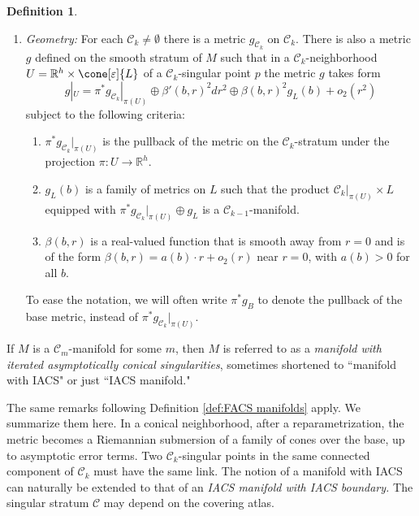 \documentclass[12pt, reqno]{amsart}
\theoremstyle{plain} %
\theoremstyle{definition}
\newtheorem{definition}[theorem]{Definition}
\theoremstyle{remark}
\numberwithin{equation}{section}
\newcommand{\cat}[1]{\mathcal{#1}}
\newcommand{\field}[1]{\mathbb{#1}}
\newcommand{\R}{\field{R}}
\newcommand{\hdim}{h} %
\begin{document}
\begin{definition}
\begin{enumerate}[label=(\alph*)]
        The \textit{\(\cat{C}_k\)-stratum} is the set of \(\cat{C}_k\)-singular points of \(M\).
        This set is denoted by \(\cat{C}_k\).
        The singular stratum is denoted by \(\cat{C}\) and is defined to be \(\cat{C} \coloneqq \cup_{k=1}^m \cat{C}_k\).
        The smooth stratum, or \(\cat{C}_0\)-stratum, is the complement \(M \setminus \cat{C}\) and is denoted by \(\cat{C}_0\).
        \item \emph{Geometry:} For each \(\cat{C}_k \neq \emptyset\) there is a metric \(g_{\cat{C}_k}\) on \(\cat{C}_k\).
        There is also a metric \(g\) defined on the smooth stratum of \(M\) such that in a \(\cat{C}_k\)-neighborhood \(U = \R^\hdim \times \cone[\varepsilon]{L}\) of a \(\cat{C}_k\)-singular point \(p\) the metric \(g\) takes form
        \begin{equation*}
            g|_U = \pi^*g_{\cat{C}_k}|_{\pi(U)} \oplus \beta'(b,r)^2 dr^2 \oplus \beta(b,r)^2 g_L(b) + o_2(r^2)
        \end{equation*}
        subject to the following criteria:
        \begin{enumerate}
            \item \(\pi^*g_{\cat{C}_k}|_{\pi(U)}\) is the pullback of the metric on the \(\cat{C}_k\)-stratum under the projection \(\pi \colon U \to \R^\hdim\).
            \item \(g_L(b)\) is a family of metrics on \(L\) such that the product \(\cat{C}_k|_{\pi(U)} \times L\) equipped with \(\pi^*g_{\cat{C}_k}|_{\pi(U)} \oplus g_L\) is a \(\cat{C}_{k-1}\)-manifold.
            \item \(\beta(b,r)\) is a real-valued function that is smooth away from \(r=0\) and is of the form \(\beta(b,r) = a(b) \cdot r + o_2(r)\) near \(r=0\), with \(a(b) > 0\) for all \(b\).
        \end{enumerate}
        To ease the notation, we will often write \(\pi^*g_B\) to denote the pullback of the base metric, instead of \(\pi^*g_{\cat{C}_k}|_{\pi(U)}\).
\end{enumerate}
\end{definition}
If \(M\) is a \(\cat{C}_m\)-manifold for some \(m\), then \(M\) is referred to as a \textit{manifold with iterated asymptotically conical singularities}, sometimes shortened to ``manifold with IACS" or just ``IACS manifold."

The same remarks following Definition \ref{def:FACS manifolds} apply.
We summarize them here.
In a conical neighborhood, after a reparametrization, the metric becomes a Riemannian submersion of a family of cones over the base, up to asymptotic error terms.
Two \(\cat{C}_k\)-singular points in the same connected component of \(\cat{C}_k\) must have the same link.
The notion of a manifold with IACS can naturally be extended to that of an \textit{IACS manifold with IACS boundary.}
The singular stratum \(\cat{C}\) may depend on the covering atlas.
\end{document}
